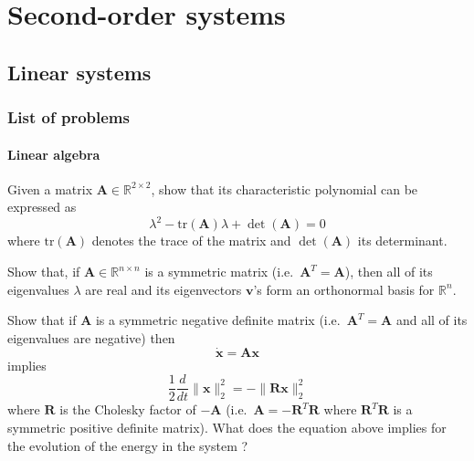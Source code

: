 \chapter{Second-order systems}\label{chap: second-order systems}

\section{Linear systems}\label{sec: linear systems}

\subsection{List of problems}

\subsubsection*{Linear algebra}

\begin{problem}
  Given a matrix $\bm{A} \in \mathbb{R}^{2 \times 2}$, show that its characteristic polynomial can be expressed as
  \[
  \lambda^2 - \text{tr}(\bm{A}) \lambda + \det(\bm{A}) = 0
  \]
  where $\text{tr}(\bm{A})$ denotes the trace of the matrix and $\det(\bm{A})$ its determinant.
\end{problem}

\bigskip

\begin{problem}
  Show that, if $\bm{A} \in \mathbb{R}^{n \times n}$ is a symmetric matrix (i.e.\ $\bm{A}^T = \bm{A}$), then all of its eigenvalues $\lambda$ are real and its eigenvectors $\bm{v}$'s form an orthonormal basis for $\mathbb{R}^n$.
\end{problem}

\bigskip

\begin{problem}
  Show that if $\bm{A}$ is a symmetric negative definite matrix (i.e.\ $\bm{A}^T = \bm{A}$ and all of its eigenvalues are negative) then
  \[
  \dot{\bm{x}} = \bm{Ax}
  \]
  implies
  \[
  \dfrac{1}{2} \dfrac{d}{dt} \| \bm{x} \|_2^2 = - \| \bm{Rx} \|_2^2
  \]
  where $\bm{R}$ is the Cholesky factor of $-\bm{A}$ (i.e.\ $\bm{A} = - \bm{R}^T \bm{R}$ where $\bm{R}^T \bm{R}$ is a symmetric positive definite matrix).
  What does the equation above implies for the evolution of the energy in the system ?
\end{problem}

\bigskip

